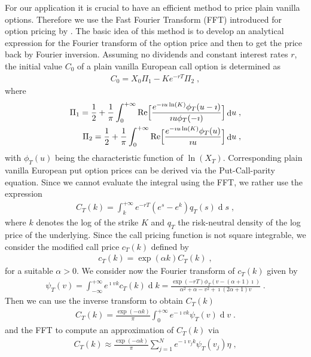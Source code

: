\documentclass[10pt,a4paper]{article}
\numberwithin{equation}{section} %
\theoremstyle{plain}
\theoremstyle{definition}
\theoremstyle{remark}
\def\D{\dif\!}
\DeclareMathOperator{\dif}{d}
\begin{document}
For our application it is crucial to have an efficient method to price plain vanilla options. Therefore we use the Fast Fourier Transform (FFT) introduced for option pricing by \cite{CM99}. The basic idea of this method is to develop an analytical expression for the Fourier transform of the option price and then to get the price back by Fourier inversion. Assuming no dividends and constant interest rates $r$, the initial value $C_0$ of a plain vanilla European call option is determined as
\begin{align*}
C_0=X_0\Pi_1-Ke^{-rT}\Pi_2\;,
\end{align*}
where
\begin{align*}
\Pi_1=\frac{1}{2}+\frac{1}{\pi}\int_0^{+\infty} {\mathop{\mathrm{Re}}\Bigl[\frac{e^{-\imath u\ln(K)}\phi_T(u-\imath)}{\imath u\phi_T(-\imath)}\Bigr]}\D u\;,\\
\Pi_2=\frac{1}{2}+\frac{1}{\pi}\int_0^{+\infty} {\mathop{\mathrm{Re}}\Bigl[\frac{e^{-\imath u\ln(K)}\phi_T(u)}{\imath u}\Bigr]}\D u\;,
\end{align*}
with $\phi_T(u)$ being the characteristic function of $\ln(X_T)$. Corresponding plain vanilla European put option prices can be derived via the Put-Call-parity equation.
Since we cannot evaluate the integral using the FFT, we rather use the expression
\begin{align*}
C_T(k)=\int_k^{+\infty}e^{-rT}(e^s-e^k)q_T(s) \D s\;,
\end{align*}
where $k$ denotes the log of the strike $K$ and $q_T$ the risk-neutral density of the log price of the underlying. Since the call pricing function is not square integrable, we consider the modified call price $c_T(k)$ defined by
\begin{align*}
c_T(k)=\exp(\alpha k)C_T(k)\;,
\end{align*}
for a suitable $\alpha>0$. We consider now the Fourier transform of $c_T(k)$ given by
\begin{align*}
\psi_T(v)=\int_{-\infty}^{+\infty}e^{\imath vk}c_T(k)\D k=\frac{\exp(-rT)\phi_T(v-(\alpha+1)\imath)}{\alpha^2+\alpha-v^2+\imath(2\alpha+1)v}\;.
\end{align*}
Then we can use the inverse transform to obtain $C_T(k)$
\begin{align*}
C_T(k)=\frac{\exp(-\alpha k)}{\pi}\int_0^{+\infty}e^{-\imath vk}\psi_T(v)\D v\;.
\end{align*}
and the FFT to compute an approximation of $C_T(k)$ via
\begin{align*}
C_T(k)\approx \frac{\exp(-\alpha k)}{\pi}\sum_{j=1}^{N}e^{-\imath v_jk}\psi_T(v_j)\eta\;,
\end{align*}
\end{document}
